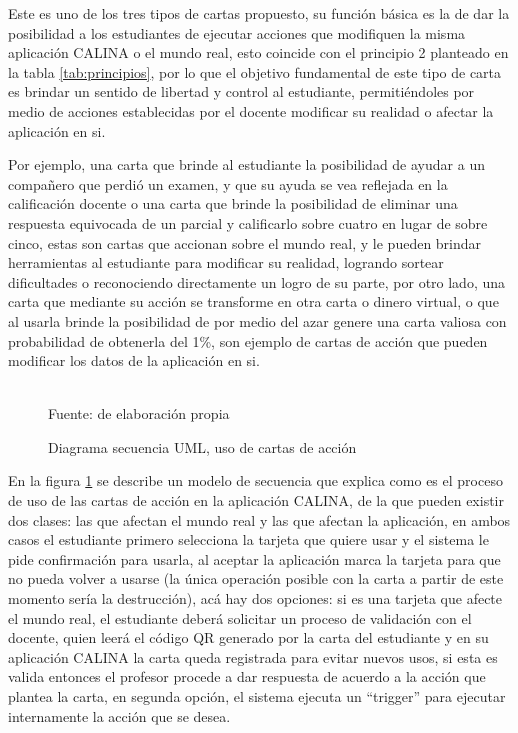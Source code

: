 Este es uno de los tres tipos de cartas propuesto, su función básica es la de dar la posibilidad a los 
estudiantes de ejecutar acciones que modifiquen la misma aplicación CALINA o el mundo real, esto coincide con 
el principio 2 planteado en la tabla \ref{tab:principios}, por lo que el objetivo fundamental de este tipo de 
carta es brindar un sentido de libertad y control al estudiante, permitiéndoles por medio de acciones 
establecidas por el docente modificar su realidad o afectar la aplicación en si.

Por ejemplo, una carta que brinde al estudiante la posibilidad de ayudar a un compañero que perdió un examen, 
y que su ayuda se vea reflejada en la calificación docente o una carta que brinde la posibilidad de eliminar 
una respuesta equivocada de un parcial y calificarlo sobre cuatro en lugar de sobre cinco, estas son cartas 
que accionan sobre el mundo real, y le pueden brindar herramientas al estudiante para modificar su realidad, 
logrando sortear dificultades o reconociendo directamente un logro de su parte, por otro lado, una carta que 
mediante su acción se transforme en otra carta o dinero virtual, o que al usarla brinde la posibilidad de por 
medio del azar genere una carta valiosa con probabilidad de obtenerla del 1\%, son ejemplo de cartas de acción 
que pueden modificar los datos de la aplicación en si.

\begin{figure}[!htb]
\caption{Diagrama secuencia UML, uso de cartas de acción}
\label{img:UMLusocartaX}
\centering
\begin{adjustbox}{width=14cm}
	
\end{adjustbox}
\\
{\footnotesize Fuente: de elaboración propia}
\end{figure}

En la figura \ref{img:UMLusocartaX} se describe un modelo de secuencia que explica como es el proceso de uso 
de las cartas de acción en la aplicación CALINA, de la que pueden existir dos clases: las que afectan el mundo 
real y las que afectan la aplicación, en ambos casos el estudiante primero selecciona la tarjeta que quiere 
usar y el sistema le pide confirmación para usarla, al aceptar la aplicación marca la tarjeta para que no 
pueda volver a usarse (la única operación posible con la carta a partir de este momento sería la destrucción), 
acá hay dos opciones: si es una tarjeta que afecte el mundo real, el estudiante deberá solicitar un proceso de 
validación con el docente, quien leerá el código QR generado por la carta del estudiante y en su aplicación 
CALINA la carta queda registrada para evitar nuevos usos, si esta es valida entonces el profesor procede a dar 
respuesta de acuerdo a la acción que plantea la carta, en segunda opción, el sistema ejecuta un ``trigger'' 
para ejecutar internamente la acción que se desea.

